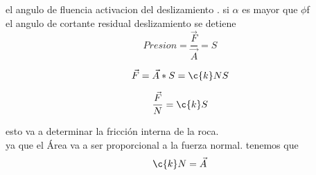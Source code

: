 \documentclass[12pt]{article}
\begin{document}
 el angulo de fluencia \textrightarrow activacion del deslizamiento . si $\alpha$ es mayor que  $\phi$f\\
 el angulo de cortante residual \textrightarrow deslizamiento se detiene\\

\begin{equation}
 Presion = \dfrac{\vec{F}}{\vec{A}} = S
\end{equation}

\begin{equation}
 \vec{F}= \vec{A} * S = \c{k} N S 
\end{equation}

\begin{equation}
 \dfrac{\vec{F}}{N} = \c{k} S
\end{equation}

esto va a determinar la fricci\'on interna de la roca. \\
ya que el \'Area va a ser proporcional a la fuerza normal. tenemos que\\

\begin{equation}
 \c{k}N = \vec{A}
\end{equation}
\end{document}
